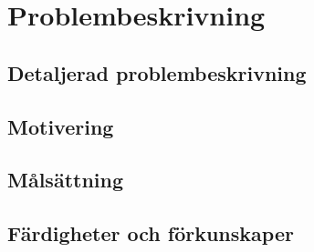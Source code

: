 \section{Problembeskrivning}
\subsection{Detaljerad problembeskrivning}
\subsection{Motivering}
\subsection{Målsättning}
\subsection{Färdigheter och förkunskaper}
